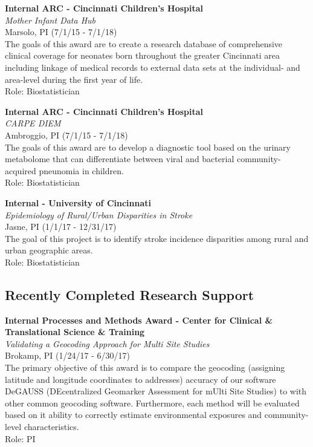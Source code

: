\documentclass{nihbiosketch}
\begin{document}
\bigskip

\textbf{Internal ARC - Cincinnati Children's Hospital}\\
\emph{Mother Infant Data Hub}\\
Marsolo, PI (7/1/15 - 7/1/18)\\
The goals of this award are to create a research database of
comprehensive clinical coverage for neonates born throughout the greater
Cincinnati area including linkage of medical records to external data
sets at the individual- and area-level during the first year of life.\\
Role: Biostatistician

\bigskip

\textbf{Internal ARC - Cincinnati Children's Hospital}\\
\emph{CARPE DIEM}\\
Ambroggio, PI (7/1/15 - 7/1/18)\\
The goals of this award are to develop a diagnostic tool based on the
urinary metabolome that can differentiate between viral and bacterial
community-acquired pneunomia in children.\\
Role: Biostatistician

\bigskip

\textbf{Internal - University of Cincinnati}\\
\emph{Epidemiology of Rural/Urban Disparities in Stroke}\\
Jasne, PI (1/1/17 - 12/31/17)\\
The goal of this project is to identify stroke incidence disparities
among rural and urban geographic areas.\\
Role: Biostatistician


\subsection*{Recently Completed Research Support}

\bigskip

\textbf{Internal Processes and Methods Award - Center for Clinical \&
	Translational Science \& Training}\\
\emph{Validating a Geocoding Approach for Multi Site Studies}\\
Brokamp, PI (1/24/17 - 6/30/17)\\
The primary objective of this award is to compare the geocoding
(assigning latitude and longitude coordinates to addresses) accuracy of
our software DeGAUSS (DEcentralized Geomarker Assessment for mUlti Site
Studies) to with other common geocoding software. Furthermore, each
method will be evaluated based on it ability to correctly estimate
environmental exposures and community-level characteristics.\\
Role: PI
\end{document}
